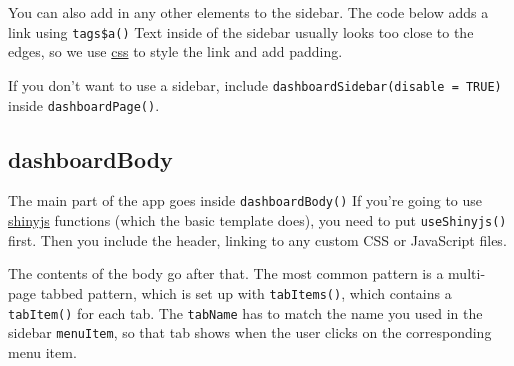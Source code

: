 \documentclass[
]{book}
\newenvironment{Shaded}{\begin{snugshade}}{\end{snugshade}}
\newcommand{\AttributeTok}[1]{\textcolor[rgb]{0.77,0.63,0.00}{#1}}
\newcommand{\FunctionTok}[1]{\textcolor[rgb]{0.00,0.00,0.00}{#1}}
\newcommand{\NormalTok}[1]{#1}
\newcommand{\SpecialCharTok}[1]{\textcolor[rgb]{0.00,0.00,0.00}{#1}}
\newcommand{\StringTok}[1]{\textcolor[rgb]{0.31,0.60,0.02}{#1}}
\begin{document}
You can also add in any other elements to the sidebar. The code below adds a link using \texttt{tags\$a()} Text inside of the sidebar usually looks too close to the edges, so we use \protect\hyperlink{CSS}{css} to style the link and add padding.

\begin{Shaded}
\end{Shaded}

If you don't want to use a sidebar, include \texttt{dashboardSidebar(disable\ =\ TRUE)} inside \texttt{dashboardPage()}.

\hypertarget{dashboardbody}{%
\subsection{dashboardBody}\label{dashboardbody}}

The main part of the app goes inside \texttt{dashboardBody()} If you're going to use \protect\hyperlink{shinyjs}{shinyjs} functions (which the basic template does), you need to put \texttt{useShinyjs()} first. Then you include the header, linking to any custom CSS or JavaScript files.

The contents of the body go after that. The most common pattern is a multi-page tabbed pattern, which is set up with \texttt{tabItems()}, which contains a \texttt{tabItem()} for each tab. The \texttt{tabName} has to match the name you used in the sidebar \texttt{menuItem}, so that tab shows when the user clicks on the corresponding menu item.
\end{document}
